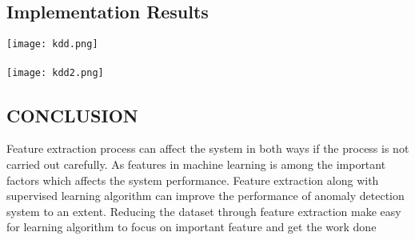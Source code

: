 \documentclass[a4paper, 12pt]{article}
\begin{document}
\subsection{Implementation Results}
\texttt{[image: kdd.png]}
\\
\\
\texttt{[image: kdd2.png]}
\newpage
\begin{center}
\section{CONCLUSION}
\end{center}
\par
Feature extraction process can affect the system in both ways if the process is not carried out carefully. As features in machine learning is among the important factors which affects the system performance. Feature extraction along with supervised learning algorithm can improve the performance of anomaly detection system to an extent. Reducing the dataset through feature extraction make easy for learning algorithm to focus on important feature and get the work done  
\\

\newpage
%
%

\end{document}
